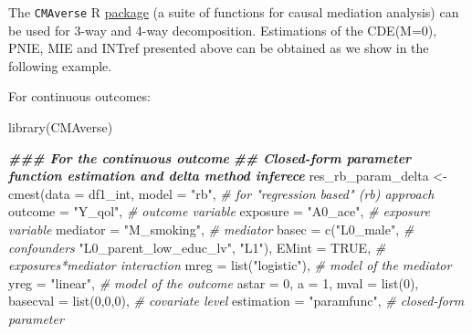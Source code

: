 \documentclass[
]{book}
\newenvironment{Shaded}{\begin{snugshade}}{\end{snugshade}}
\newcommand{\AttributeTok}[1]{\textcolor[rgb]{0.77,0.63,0.00}{#1}}
\newcommand{\CommentTok}[1]{\textcolor[rgb]{0.56,0.35,0.01}{\textit{#1}}}
\newcommand{\ConstantTok}[1]{\textcolor[rgb]{0.00,0.00,0.00}{#1}}
\newcommand{\DecValTok}[1]{\textcolor[rgb]{0.00,0.00,0.81}{#1}}
\newcommand{\DocumentationTok}[1]{\textcolor[rgb]{0.56,0.35,0.01}{\textbf{\textit{#1}}}}
\newcommand{\FunctionTok}[1]{\textcolor[rgb]{0.00,0.00,0.00}{#1}}
\newcommand{\NormalTok}[1]{#1}
\newcommand{\OtherTok}[1]{\textcolor[rgb]{0.56,0.35,0.01}{#1}}
\newcommand{\StringTok}[1]{\textcolor[rgb]{0.31,0.60,0.02}{#1}}
\begin{document}
The \texttt{CMAverse} R \href{https://bs1125.github.io/CMAverse/index.html}{package} (a suite of functions for causal mediation analysis) can be used for 3-way and 4-way decomposition. Estimations of the CDE(M=0), PNIE, MIE and INTref presented above can be obtained as we show in the following example.

For continuous outcomes:

\begin{Shaded}
\begin{Highlighting}[]
\FunctionTok{library}\NormalTok{(CMAverse)}

\DocumentationTok{\#\#\# For the continuous outcome}
\DocumentationTok{\#\# Closed{-}form parameter function estimation and delta method inferece}
\NormalTok{res\_rb\_param\_delta }\OtherTok{\textless{}{-}} \FunctionTok{cmest}\NormalTok{(}\AttributeTok{data =}\NormalTok{ df1\_int,}
                            \AttributeTok{model =} \StringTok{"rb"}\NormalTok{, }\CommentTok{\# for "regression based" (rb) approach}
                            \AttributeTok{outcome =} \StringTok{"Y\_qol"}\NormalTok{,        }\CommentTok{\# outcome variable}
                            \AttributeTok{exposure =} \StringTok{"A0\_ace"}\NormalTok{,      }\CommentTok{\# exposure variable}
                            \AttributeTok{mediator =} \StringTok{"M\_smoking"}\NormalTok{,   }\CommentTok{\# mediator}
                            \AttributeTok{basec =} \FunctionTok{c}\NormalTok{(}\StringTok{"L0\_male"}\NormalTok{,      }\CommentTok{\# confounders}
                                      \StringTok{"L0\_parent\_low\_educ\_lv"}\NormalTok{,}
                                      \StringTok{"L1"}\NormalTok{),}
                            \AttributeTok{EMint =} \ConstantTok{TRUE}\NormalTok{, }\CommentTok{\# exposures*mediator interaction}
                            \AttributeTok{mreg =} \FunctionTok{list}\NormalTok{(}\StringTok{"logistic"}\NormalTok{), }\CommentTok{\# model of the mediator}
                            \AttributeTok{yreg =} \StringTok{"linear"}\NormalTok{,       }\CommentTok{\# model of the outcome}
                            \AttributeTok{astar =} \DecValTok{0}\NormalTok{,}
                            \AttributeTok{a =} \DecValTok{1}\NormalTok{,}
                            \AttributeTok{mval =} \FunctionTok{list}\NormalTok{(}\DecValTok{0}\NormalTok{),}
                            \AttributeTok{basecval =} \FunctionTok{list}\NormalTok{(}\DecValTok{0}\NormalTok{,}\DecValTok{0}\NormalTok{,}\DecValTok{0}\NormalTok{),      }\CommentTok{\# covariate level}
                            \AttributeTok{estimation =} \StringTok{"paramfunc"}\NormalTok{, }\CommentTok{\#  closed{-}form parameter}

\end{Highlighting}
\end{Shaded}
\end{document}
